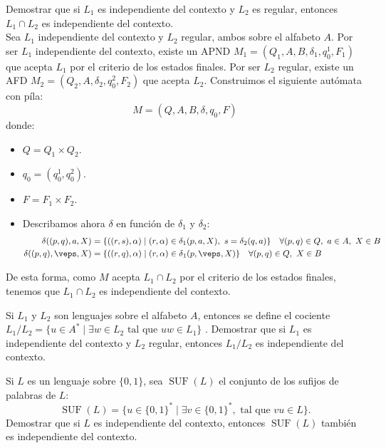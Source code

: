 \begin{ejercicio}\label{ej:1.6.16}
    Demostrar que si $L_1$ es independiente del contexto y $L_2$ es regular, entonces $L_1\cap L_2$ es independiente del contexto.\\

    Sea $L_1$ independiente del contexto y $L_2$ regular, ambos sobre el alfabeto $A$. Por ser $L_1$ independiente del contexto, existe un APND $M_1=(Q_1,A,B,\delta_1,q_0^1,F_1)$ que acepta $L_1$ por el criterio de los estados finales. Por ser $L_2$ regular, existe un AFD $M_2=(Q_2,A,\delta_2,q_0^2,F_2)$ que acepta $L_2$. Construimos el siguiente autómata con píla:
    \begin{equation*}
        M=(Q,A,B,\delta,q_0,F)
    \end{equation*}
    donde:
    \begin{itemize}
        \item $Q=Q_1\times Q_2$.
        \item $q_0=(q_0^1,q_0^2)$.
        \item $F=F_1\times F_2$.
        \item Describamos ahora $\delta$ en función de $\delta_1$ y $\delta_2$:
        \begin{align*}
            \delta((p,q),a,X)&=\{((r,s),\alpha)\mid (r,\alpha)\in \delta_1(p,a,X),~s=\delta_2(q,a)\}\quad \forall (p,q)\in Q,~a\in A,~X\in B\\
            \delta((p,q),\veps,X)&=\{((r,q),\alpha)\mid (r,\alpha)\in \delta_1(p,\veps,X)\}\quad \forall (p,q)\in Q,~X\in B
        \end{align*}
    \end{itemize}

    De esta forma, como $M$ acepta $L_1\cap L_2$ por el criterio de los estados finales, tenemos que $L_1\cap L_2$ es independiente del contexto.
\end{ejercicio}

\begin{ejercicio}\label{ej:1.6.17}
    Si $L_1$ y $L_2$ son lenguajes sobre el alfabeto $A$, entonces se define el cociente $L_1/L_2 = \{u\in A^\ast \mid \exists w\in L_2 \text{\ tal que\ } uw\in L_1\}$ . Demostrar que si $L_1$ es independiente del contexto y $L_2$ regular, entonces $L_1/L_2$ es independiente del contexto.

\end{ejercicio}

\begin{ejercicio}\label{ej:1.6.18}
    Si $L$ es un lenguaje sobre $\{0,1\}$, sea $\operatorname{SUF}(L)$ el conjunto de los sufijos de palabras de $L$: 
    \begin{equation*}
        \operatorname{SUF}(L) = \{u\in {\{0,1\}}^{\ast} \mid \exists v\in {\{0,1\}}^{\ast}, \text{\ tal que\ } vu\in L\}.
    \end{equation*}
    Demostrar que si $L$ es independiente del contexto, entonces $\operatorname{SUF}(L)$ también es independiente del contexto.

\end{ejercicio}

